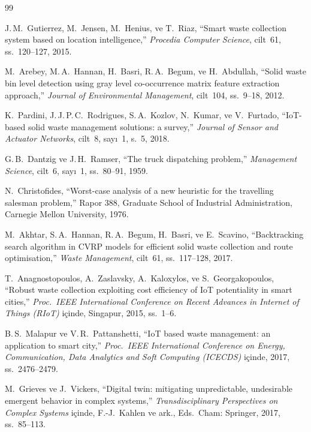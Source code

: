 \documentclass[12pt,a4paper]{report}
\begin{document}
\renewcommand{\bibname}{BIBLIOGRAPHY}
\begin{thebibliography}{99}

J.\,M.\ Gutierrez, M.\ Jensen, M.\ Henius, ve T.\ Riaz,
``Smart waste collection system based on location intelligence,''
\textit{Procedia Computer Science}, cilt~61, ss.\ 120--127, 2015.

M.\ Arebey, M.\,A.\ Hannan, H.\ Basri, R.\,A.\ Begum, ve H.\ Abdullah,
``Solid waste bin level detection using gray level co-occurrence matrix feature extraction approach,''
\textit{Journal of Environmental Management}, cilt~104, ss.\ 9--18, 2012.

K.\ Pardini, J.\,J.\,P.\,C.\ Rodrigues, S.\,A.\ Kozlov, N.\ Kumar, ve V.\ Furtado,
``IoT-based solid waste management solutions: a survey,''
\textit{Journal of Sensor and Actuator Networks}, cilt~8, sayı~1, s.~5, 2018.

G.\,B.\ Dantzig ve J.\,H.\ Ramser,
``The truck dispatching problem,''
\textit{Management Science}, cilt~6, sayı~1, ss.\ 80--91, 1959.

N.\ Christofides,
``Worst-case analysis of a new heuristic for the travelling salesman problem,''
Rapor 388, Graduate School of Industrial Administration, Carnegie Mellon University, 1976.

M.\ Akhtar, S.\,A.\ Hannan, R.\,A.\ Begum, H.\ Basri, ve E.\ Scavino,
``Backtracking search algorithm in CVRP models for efficient solid waste collection and route optimisation,''
\textit{Waste Management}, cilt~61, ss.\ 117--128, 2017.

T.\ Anagnostopoulos, A.\ Zaslavsky, A.\ Kaloxylos, ve S.\ Georgakopoulos,
``Robust waste collection exploiting cost efficiency of IoT potentiality in smart cities,''
\textit{Proc.\ IEEE International Conference on Recent Advances in Internet of Things (RIoT)} içinde,
Singapur, 2015, ss.\ 1--6.

B.\,S.\ Malapur ve V.\,R.\ Pattanshetti,
``IoT based waste management: an application to smart city,''
\textit{Proc.\ IEEE International Conference on Energy, Communication, Data Analytics and Soft Computing (ICECDS)} içinde,
2017, ss.\ 2476--2479.

M.\ Grieves ve J.\ Vickers,
``Digital twin: mitigating unpredictable, undesirable emergent behavior in complex systems,''
\textit{Transdisciplinary Perspectives on Complex Systems} içinde,
F.-J.\ Kahlen ve ark., Eds.\ Cham: Springer, 2017, ss.\ 85--113.


\end{thebibliography}
\end{document}
